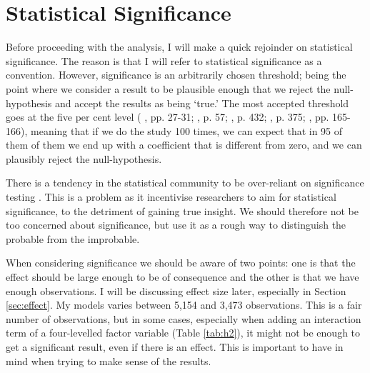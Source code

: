 \section{Statistical Significance}
Before proceeding with the analysis, I will make a quick rejoinder on statistical significance. The reason is that I will refer to statistical significance as a convention. However, significance is an arbitrarily chosen threshold; being the point where we consider a result to be plausible enough that we reject the null-hypothesis and accept the results as being `true.' The most accepted threshold goes at the five per cent level (\citeauthor{christophersen_introduksjon_2018} \citeyear{christophersen_introduksjon_2018}, pp. 27-31; \citeauthor{gelman_regression_2021} \citeauthor{gelman_regression_2021}, p. 57; \citeauthor{halperin_political_2020} \citeyear{halperin_political_2020},  p. 432; \citeauthor{hellevik_forskningsmetode_2002} \citeyear{hellevik_forskningsmetode_2002}, p. 375; \citeauthor{kellstedt_fundamentals_2018} \citeyear{kellstedt_fundamentals_2018}, pp. 165-166), meaning that if we do the study 100 times, we can expect that in 95 of them of them we end up with a coefficient that is different from zero, and we can plausibly reject the null-hypothesis.

There is a tendency in the statistical community to be over-reliant on significance testing \citep{barnett_examination_2019, gelman_regression_2021, imbens_statistical_2021, van_zwet_significance_2021}. This is a problem as it incentivise researchers to aim for statistical significance, to the detriment of gaining true insight. We should therefore not be too concerned about significance, but use it as a rough way to distinguish the probable from the improbable.

When considering significance we should be aware of two points: one is that the effect should be large enough to be of consequence and the other is that we have enough observations. I will be discussing effect size later, especially in Section \ref{sec:effect}. My models varies between 5,154 and 3,473 observations. This is a fair number of observations, but in some cases, especially when adding an interaction term of a four-levelled factor variable (Table \ref{tab:h2}), it might not be enough to get a significant result, even if there is an effect. This is important to have in mind when trying to make sense of the results.

